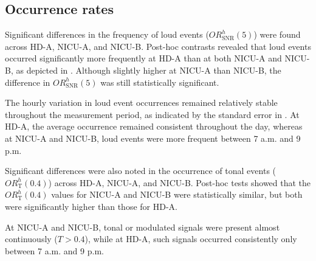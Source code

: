 



\subsection{Occurrence rates}

Significant differences in the frequency of loud events ($\textit{OR}_\text{SNR}^h(5)$) were found across HD-A, NICU-A, and NICU-B. Post-hoc contrasts revealed that loud events occurred significantly more frequently at HD-A than at both NICU-A and NICU-B, as depicted in . Although slightly higher at NICU-A than NICU-B, the difference in $\textit{OR}_\text{SNR}^h(5)$ was still statistically significant.

The hourly variation in loud event occurrences remained relatively stable throughout the measurement period, as indicated by the standard error in . At HD-A, the average occurrence remained consistent throughout the day, whereas at NICU-A and NICU-B, loud events were more frequent between 7 a.m. and 9 p.m.

Significant differences were also noted in the occurrence of tonal events ($\textit{OR}_\text{T}^h(0.4)$) across HD-A, NICU-A, and NICU-B. Post-hoc tests showed that the $\textit{OR}_\text{T}^h(0.4)$ values for NICU-A and NICU-B were statistically similar, but both were significantly higher than those for HD-A.

At NICU-A and NICU-B, tonal or modulated signals were present almost continuously ($T>0.4$), while at HD-A, such signals occurred consistently only between 7 a.m. and 9 p.m.